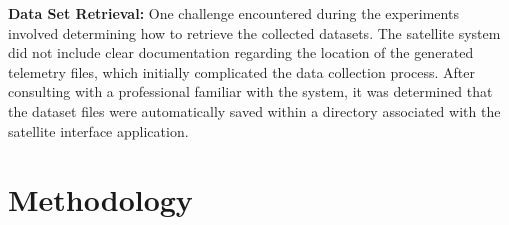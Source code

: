 \documentclass[conference]{IEEEtran}
\begin{document}
\textbf{Data Set Retrieval:}
One challenge encountered during the experiments involved determining how to retrieve the collected datasets. The satellite system did not include clear documentation regarding the location of the generated telemetry files, which initially complicated the data collection process. After consulting with a professional familiar with the system, it was determined that the dataset files were automatically saved within a directory associated with the satellite interface application.


\section{Methodology}
\end{document}
